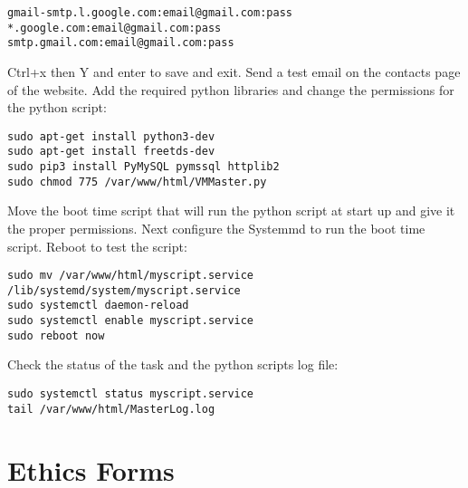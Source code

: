 \documentclass[a4paper,11pt]{article}
\numberwithin{figure}{section}
\numberwithin{table}{section}
\begin{document}
\begin{appendices}
\begin{lstlisting}[firstnumber=26]
gmail-smtp.l.google.com:email@gmail.com:pass
*.google.com:email@gmail.com:pass
smtp.gmail.com:email@gmail.com:pass
\end{lstlisting}
Ctrl+x then Y and enter to save and exit. Send a test email on the contacts page of the website. Add the required python libraries and change the permissions for the python script:
\begin{lstlisting}[firstnumber=29]
sudo apt-get install python3-dev
sudo apt-get install freetds-dev
sudo pip3 install PyMySQL pymssql httplib2
sudo chmod 775 /var/www/html/VMMaster.py
\end{lstlisting}
Move the boot time script that will run the python script at start up and give it the proper permissions. Next configure the Systemmd to run the boot time script. Reboot to test the script:
\begin{lstlisting}[firstnumber=33]
sudo mv /var/www/html/myscript.service /lib/systemd/system/myscript.service
sudo systemctl daemon-reload
sudo systemctl enable myscript.service
sudo reboot now
\end{lstlisting}
Check the status of the task and the python scripts log file:
\begin{lstlisting}[firstnumber=37]
sudo systemctl status myscript.service
tail /var/www/html/MasterLog.log
\end{lstlisting}

\newpage

\section{Ethics Forms}\thispagestyle{sectionstart}
	\begin{changemargin}{-1cm}{-1cm}
	\begin{center}
	\texttt{[image: \{Signatureform]}.jpg}
	\end{center}
	\end{changemargin}		
\end{appendices}
\end{document}
